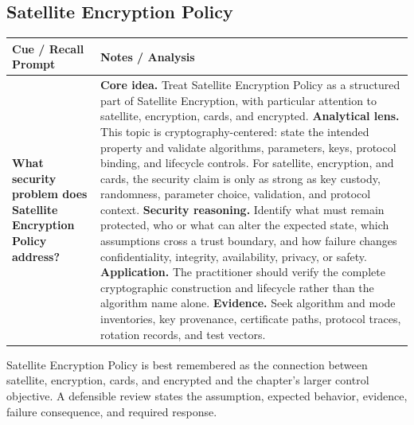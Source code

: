 \documentclass[11pt]{article}
\newcommand{\CornellHeader}{%
\rowcolor{Navy}\color{white}\bfseries Cue / Recall Prompt & \color{white}\bfseries Notes / Analysis\\\hline}
\newcommand{\CornellRow}[2]{%
\cellcolor{CueGray}\RaggedRight\textbf{#1} & \RaggedRight #2\\\hline}
\begin{document}
\subsection*{Satellite Encryption Policy}
\begin{longtable}{>{\RaggedRight\arraybackslash}p{}|>{\RaggedRight\arraybackslash}p{}}
\CornellHeader
\CornellRow{What security problem does Satellite Encryption Policy address?}{\textbf{Core idea.} Treat Satellite Encryption Policy as a structured part of Satellite Encryption, with particular attention to satellite, encryption, cards, and encrypted. \textbf{Analytical lens.} This topic is cryptography-centered: state the intended property and validate algorithms, parameters, keys, protocol binding, and lifecycle controls. For satellite, encryption, and cards, the security claim is only as strong as key custody, randomness, parameter choice, validation, and protocol context. \textbf{Security reasoning.} Identify what must remain protected, who or what can alter the expected state, which assumptions cross a trust boundary, and how failure changes confidentiality, integrity, availability, privacy, or safety. \textbf{Application.} The practitioner should verify the complete cryptographic construction and lifecycle rather than the algorithm name alone. \textbf{Evidence.} Seek algorithm and mode inventories, key provenance, certificate paths, protocol traces, rotation records, and test vectors.}
\end{longtable}
\begin{topicsummary}
Satellite Encryption Policy is best remembered as the connection between satellite, encryption, cards, and encrypted and the chapter's larger control objective. A defensible review states the assumption, expected behavior, evidence, failure consequence, and required response.
\end{topicsummary}
\end{document}

